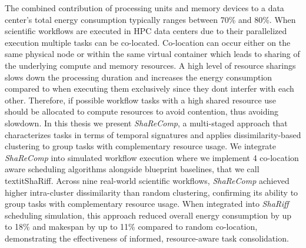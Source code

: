 \documentclass[a4paper, 11pt]{article}
\begin{document}
The combined contribution of processing units and memory devices to a data center's total energy consumption typically ranges between 70\% and 80\%. When scientific workflows are executed in HPC data centers due to their parallelized execution multiple tasks can be co-located. Co-location can occur either on the same physical node or within the same virtual container which leads to sharing of the underlying compute and memory resources. A high level of resource sharings slows down the processing duration and increases the energy consumption compared to when executing them exclusively since they dont interfer with each other. Therefore, if possible workflow tasks with a high shared resource use should be allocated to compute resources to avoid contention, thus avoiding slowdown. In this thesis we present \textit{ShaReComp}, a multi-staged approach that characterizes tasks in terms of temporal signatures and applies dissimilarity-based clustering to group tasks with complementary resource usage. We integrate \textit{ShaReComp} into simulated workflow execution where we implement 4 co-location aware scheduling algorithms alongside blueprint baselines, that we call  textit{ShaRiff}. Across nine real-world scientific workflows, \textit{ShaReComp} achieved higher intra-cluster dissimilarity than random clustering, confirming its ability to group tasks with complementary resource usage. When integrated into \textit{ShaRiff} scheduling simulation, this approach reduced overall energy consumption by up to 18\% and makespan by up to 11\% compared to random co-location, demonstrating the effectiveness of informed, resource-aware task consolidation.
\end{document}
